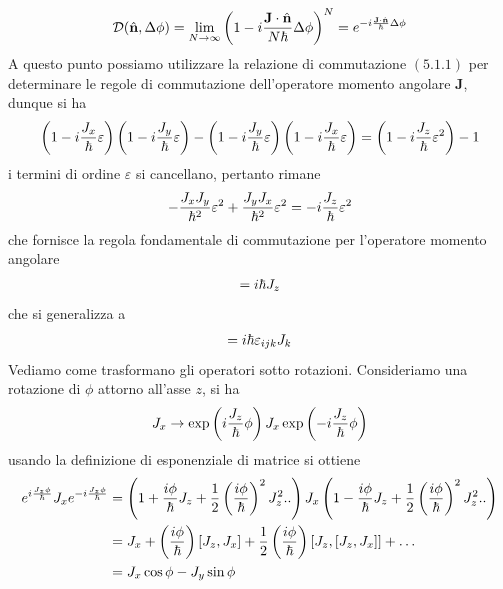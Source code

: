\documentclass{article}
\begin{document}
\begin{gather}
    \mathcal{D}(\hat{\mathbf{n}}, \Delta \phi) = \lim_{N \rightarrow \infty} \left( 1 - i\frac{\mathbf{J} \cdot \hat{\mathbf{n}}}{N\hbar}\Delta \phi \right)^N = e^{-i\frac{\mathbf{J} \cdot \hat{\mathbf{n}}}{\hbar}\Delta \phi} \notag
\end{gather}
A questo punto possiamo utilizzare la relazione di commutazione $(5.1.1)$ per determinare le regole di commutazione dell'operatore momento angolare $\mathbf{J}$, dunque si ha
\begin{align}
    \left( 1 - i\frac{J_x}{\hbar}\varepsilon \right)\left( 1 - i\frac{J_y}{\hbar}\varepsilon \right) - \left( 1 - i\frac{J_y}{\hbar}\varepsilon \right)\left( 1 - i\frac{J_x}{\hbar}\varepsilon \right) = \left( 1 - i\frac{J_z}{\hbar}\varepsilon^2 \right) - 1 \notag
\end{align}
i termini di ordine $\varepsilon$ si cancellano, pertanto rimane
\begin{align}
    -\frac{J_xJ_y}{\hbar^2}\varepsilon^2 + \frac{J_yJ_x}{\hbar^2}\varepsilon^2 = -i\frac{J_z}{\hbar}\varepsilon^2 \notag
\end{align}
che fornisce la regola fondamentale di commutazione per l'operatore momento angolare
\begin{gather}
    [J_x, J_y] = i\hbar J_z \notag
\end{gather}
che si generalizza a
\begin{gather}
    [J_i, J_j] = i\hbar \varepsilon_{ijk}J_k \notag
\end{gather}
Vediamo come trasformano gli operatori sotto rotazioni. Consideriamo una rotazione di $\phi$ attorno all'asse $z$, si ha
\begin{align}
    J_x \rightarrow \exp\left( i\frac{J_z}{\hbar}\phi \right)J_x\exp\left( -i\frac{J_z}{\hbar}\phi \right) \notag
\end{align}
usando la definizione di esponenziale di matrice si ottiene
\begin{align}
    e^{i\frac{J_z\phi}{\hbar}}J_xe^{-i\frac{J_z\phi}{\hbar}} &= \left( 1 + \frac{i\phi}{\hbar}J_z + \frac{1}{2}\left( \frac{i\phi}{\hbar} \right)^2J_z^2 .. \right)J_x\left( 1 - \frac{i\phi}{\hbar}J_z + \frac{1}{2}\left( \frac{i\phi}{\hbar} \right)^2J_z^2 .. \right) \notag \\
    &= J_x + \left( \frac{i\phi}{\hbar} \right)[J_z, J_x] + \frac{1}{2}\left( \frac{i\phi}{\hbar} \right)[J_z, [J_z, J_x]] + \dots \notag \\
    &= J_x\cos \phi - J_y\sin \phi \notag
\end{align}
\end{document}
